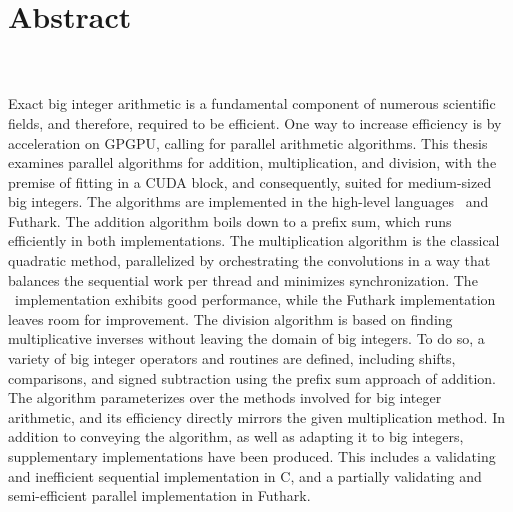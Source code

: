 \thispagestyle{empty}
{\centering
  \section*{Abstract}
}
\label{sec:abstract}
\hfill\\\\

Exact big integer arithmetic is a fundamental component of numerous scientific
fields, and therefore, required to be efficient. One way to increase efficiency
is by acceleration on GPGPU, calling for parallel arithmetic algorithms. This
thesis examines parallel algorithms for addition, multiplication, and division,
with the premise of fitting in a CUDA block, and consequently, suited for
medium-sized big integers. The algorithms are implemented in the high-level
languages \cpp\ and Futhark. The addition algorithm boils down to a prefix sum,
which runs efficiently in both implementations. The multiplication algorithm is
the classical quadratic method, parallelized by orchestrating the convolutions
in a way that balances the sequential work per thread and minimizes
synchronization. The \cpp\ implementation exhibits good performance, while the
Futhark implementation leaves room for improvement. The division algorithm is
based on finding multiplicative inverses without leaving the domain of big
integers. To do so, a variety of big integer operators and routines are defined,
including shifts, comparisons, and signed subtraction using the prefix sum
approach of addition. The algorithm parameterizes over the methods involved for
big integer arithmetic, and its efficiency directly mirrors the given
multiplication method. In addition to conveying the algorithm, as well as
adapting it to big integers, supplementary implementations have been
produced. This includes a validating and inefficient sequential implementation
in C, and a partially validating and semi-efficient parallel implementation in
Futhark.

\restoregeometry

